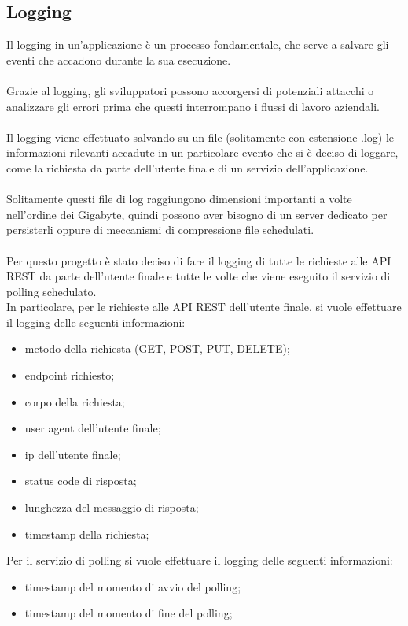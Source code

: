 \subsection{Logging}
Il logging in un'applicazione è un processo fondamentale, che serve a salvare gli eventi che accadono durante
la sua esecuzione.
\\\\
Grazie al logging, gli sviluppatori possono accorgersi di potenziali attacchi o analizzare gli
errori prima che questi interrompano i flussi di lavoro aziendali.
\\\\
Il logging viene effettuato salvando su un file (solitamente con estensione .log) le informazioni rilevanti
accadute in un particolare evento che si è deciso di loggare, come la richiesta da parte
dell'utente finale di un servizio dell'applicazione.
\\\\
Solitamente questi file di log raggiungono dimensioni importanti a volte nell'ordine dei Gigabyte, quindi possono aver bisogno di
un server dedicato per persisterli oppure di meccanismi di compressione file schedulati.
\\\\
Per questo progetto è stato deciso di fare il logging di tutte le richieste alle \gls{API} \gls{REST} da parte dell'utente
finale e tutte le volte che viene eseguito il servizio di polling schedulato.
\\
In particolare, per le richieste alle \gls{API} \gls{REST} dell'utente finale, si vuole effettuare il logging delle seguenti 
informazioni:
\begin{itemize}
    \item metodo della richiesta (GET, POST, PUT, DELETE);
    \item \gls{endpoint} richiesto;
    \item corpo della richiesta;
    \item user agent dell'utente finale;
    \item ip dell'utente finale;
    \item status code di risposta;
    \item lunghezza del messaggio di risposta;
    \item timestamp della richiesta;
\end{itemize}
\leavevmode\newline
Per il servizio di polling si vuole effettuare il logging delle seguenti informazioni:
\begin{itemize}
    \item timestamp del momento di avvio del polling;
    \item timestamp del momento di fine del polling;
\end{itemize}
